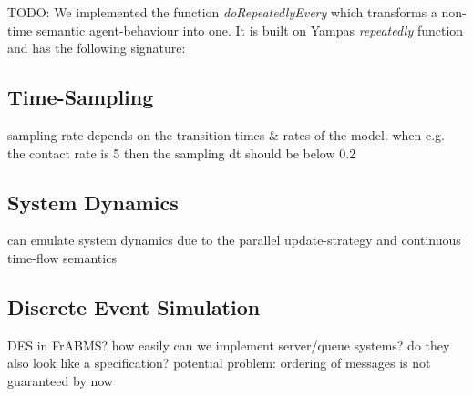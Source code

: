 TODO: We implemented the function \textit{doRepeatedlyEvery} which transforms a non-time semantic agent-behaviour into one. It is built on Yampas \textit{repeatedly} function and has the following signature:


\subsection{Time-Sampling}
sampling rate depends on the transition times \& rates of the model. when e.g. the contact rate is 5 then the sampling dt should be below 0.2

\subsection{System Dynamics}
can emulate system dynamics due to the parallel update-strategy and continuous time-flow semantics

\subsection{Discrete Event Simulation}
DES in FrABMS? how easily can we implement server/queue systems? do they also look like a specification? potential problem: ordering of messages is not guaranteed by now

